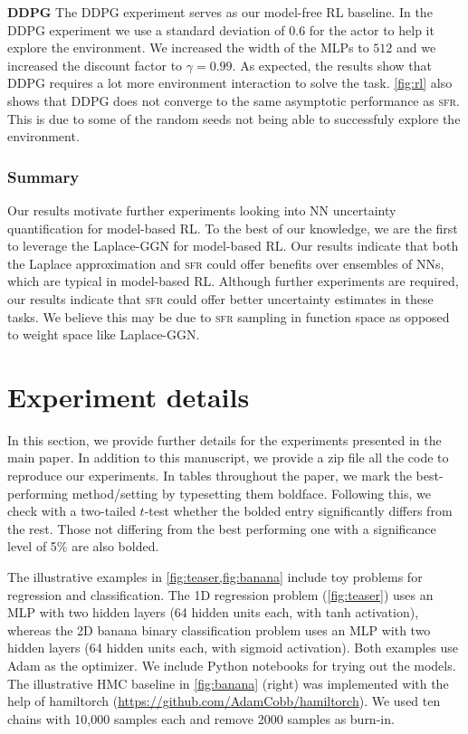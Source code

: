 \documentclass{article} %
\newcommand{\our}{\textsc{sfr}\xspace}
\begin{document}
\textbf{DDPG}
The DDPG experiment serves as our model-free RL baseline.
In the DDPG experiment we use a standard deviation of $0.6$ for the actor to help it explore
the environment.
We increased the width of the MLPs to $512$ and we increased the discount factor to $\gamma=0.99$.
As expected, the results show that DDPG requires a lot more environment interaction to solve the task.
\cref{fig:rl} also shows that DDPG does not converge to the same asymptotic performance as \our.
This is due to some of the random seeds not being able to successfuly explore the environment.

\subsubsection{Summary}
Our results motivate further experiments looking into NN uncertainty quantification
for model-based RL.
To the best of our knowledge, we are the first to leverage the Laplace-GGN for model-based RL.
Our results indicate that both the Laplace approximation and \our could offer benefits over
ensembles of NNs, which are typical in model-based RL.
Although further experiments are required, our results indicate that \our could offer
better uncertainty estimates in these tasks.
We believe this may be due to \our sampling in function space as opposed to weight space like
Laplace-GGN.


\section{Experiment details}
\label{app:experiments}
%
In this section, we provide further details for the experiments presented in the main paper. In addition to this manuscript, we provide a zip file all the code to reproduce our experiments. In tables throughout the paper, we mark the best-performing method/setting by typesetting them boldface. Following this, we check with a two-tailed $t$-test whether the bolded entry significantly differs from the rest. Those not differing from the best performing one with a significance level of 5\% are also bolded.

The illustrative examples in \cref{fig:teaser,fig:banana} include toy problems for regression and classification. The 1D regression problem (\cref{fig:teaser}) uses an MLP with two hidden layers (64 hidden units each, with tanh activation), whereas the 2D banana binary classification problem uses an MLP with two hidden layers (64 hidden units each, with sigmoid activation). Both examples use Adam as the optimizer. We include Python notebooks for trying out the models. The illustrative HMC baseline in \cref{fig:banana} (right) was implemented with the help of hamiltorch (\url{https://github.com/AdamCobb/hamiltorch}). We used ten chains with 10,000 samples each and remove 2000 samples as burn-in.
\end{document}
